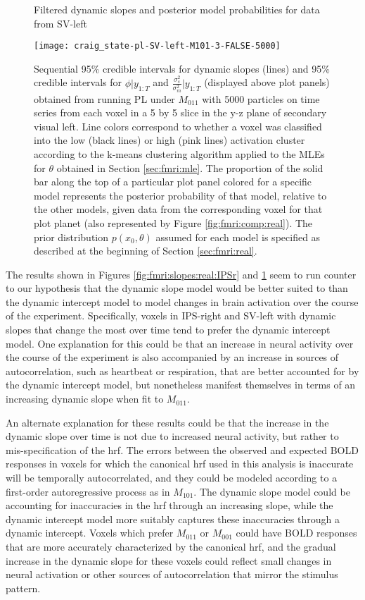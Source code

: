 \begin{figure}
\ssp
\centering
\caption{Filtered dynamic slopes and posterior model probabilities for data from SV-left} \label{fig:fmri:slopes:real}
\texttt{[image: craig\_state-pl-SV-left-M101-3-FALSE-5000]}
\caption*{Sequential 95\% credible intervals for dynamic slopes (lines) and 95\% credible intervals for $\phi|y_{1:T}$ and $\frac{\sigma^2_s}{\sigma^2_m}|y_{1:T}$ (displayed above plot panels) obtained from running PL under $M_{011}$ with 5000 particles on time series from each voxel in a 5 by 5 slice in the y-z plane of secondary visual left. Line colors correspond to whether a voxel was classified into the low (black lines) or high (pink lines) activation cluster according to the k-means clustering algorithm applied to the MLEs for $\theta$ obtained in Section \ref{sec:fmri:mle}. The proportion of the solid bar along the top of a particular plot panel colored for a specific model represents the posterior probability of that model, relative to the other models, given data from the corresponding voxel for that plot planet (also represented by Figure \ref{fig:fmri:comp:real}). The prior distribution $p(x_0,\theta)$ assumed for each model is specified as described at the beginning of Section \ref{sec:fmri:real}.}
\end{figure}

The results shown in Figures \ref{fig:fmri:slopes:real:IPSr} and \ref{fig:fmri:slopes:real} seem to run counter to our hypothesis that the dynamic slope model would be better suited to than the dynamic intercept model to model changes in brain activation over the course of the experiment. Specifically, voxels in IPS-right and SV-left with dynamic slopes that change the most over time tend to prefer the dynamic intercept model. One explanation for this could be that an increase in neural activity over the course of the experiment is also accompanied by an increase in sources of autocorrelation, such as heartbeat or respiration, that are better accounted for by the dynamic intercept model, but nonetheless manifest themselves in terms of an increasing dynamic slope when fit to $M_{011}$.

An alternate explanation for these results could be that the increase in the dynamic slope over time is not due to increased neural activity, but rather to mis-specification of the hrf. The errors between the observed and expected BOLD responses in voxels for which the canonical hrf used in this analysis is inaccurate will be temporally autocorrelated, and they could be modeled according to a first-order autoregressive process as in $M_{101}$. The dynamic slope model could be accounting for inaccuracies in the hrf through an increasing slope, while the dynamic intercept model more suitably captures these inaccuracies through a dynamic intercept. Voxels which prefer $M_{011}$ or $M_{001}$ could have BOLD responses that are more accurately characterized by the canonical hrf, and the gradual increase in the dynamic slope for these voxels could reflect small changes in neural activation or other sources of autocorrelation that mirror the stimulus pattern.

